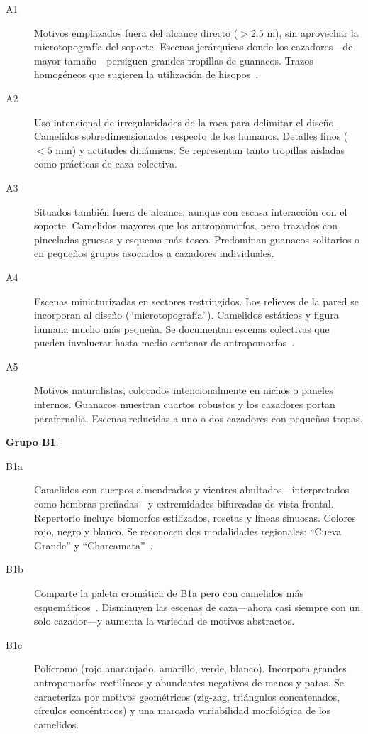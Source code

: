 \begin{description}
  \item[A1]  Motivos emplazados fuera del alcance directo (\(>\!2.5\) m), sin aprovechar la microtopografía del soporte.
  Escenas jerárquicas donde los cazadores—de mayor tamaño—persiguen grandes tropillas de guanacos.
  Trazos homogéneos que sugieren la utilización de hisopos~\cite{aschero2012}.

  \item[A2]  Uso intencional de irregularidades de la roca para delimitar el diseño.
  Camelidos sobredimensionados respecto de los humanos.
  Detalles finos (\(<\!5\) mm) y actitudes dinámicas.
  Se representan tanto tropillas aisladas como prácticas de caza colectiva.

  \item[A3]  Situados también fuera de alcance, aunque con escasa interacción con el soporte.
  Camelidos mayores que los antropomorfos, pero trazados con pinceladas gruesas y esquema más tosco.
  Predominan guanacos solitarios o en pequeños grupos asociados a cazadores individuales.

  \item[A4]  Escenas miniaturizadas en sectores restringidos.
  Los relieves de la pared se incorporan al diseño (“microtopografía”).
  Camelidos estáticos y figura humana mucho más pequeña.
  Se documentan escenas colectivas que pueden involucrar hasta medio centenar de antropomorfos~\cite{aschero2012}.

  \item[A5]  Motivos naturalistas, colocados intencionalmente en nichos o paneles internos.
  Guanacos muestran cuartos robustos y los cazadores portan parafernalia.
  Escenas reducidas a uno o dos cazadores con pequeñas tropas.
\end{description}

\medskip
\textbf{Grupo B1}:

\begin{description}
  \item[B1a]  Camelidos con cuerpos almendrados y vientres abultados—interpretados como hembras preñadas—y extremidades bifurcadas de vista frontal.
  Repertorio incluye biomorfos estilizados, rosetas y líneas sinuosas.
  Colores rojo, negro y blanco.
  Se reconocen dos modalidades regionales: “Cueva Grande” y “Charcamata”~\cite{aschero2018b,aschero2021}.

  \item[B1b]  Comparte la paleta cromática de B1a pero con camelidos más esquemáticos~\cite{aschero2023}.
  Disminuyen las escenas de caza—ahora casi siempre con un solo cazador—y aumenta la variedad de motivos abstractos.

  \item[B1c]  Polícromo (rojo anaranjado, amarillo, verde, blanco).
  Incorpora grandes antropomorfos rectilíneos y abundantes negativos de manos y patas.
  Se caracteriza por motivos geométricos (zig-zag, triángulos concatenados, círculos concéntricos) y una marcada variabilidad morfológica de los camelidos.
\end{description}

